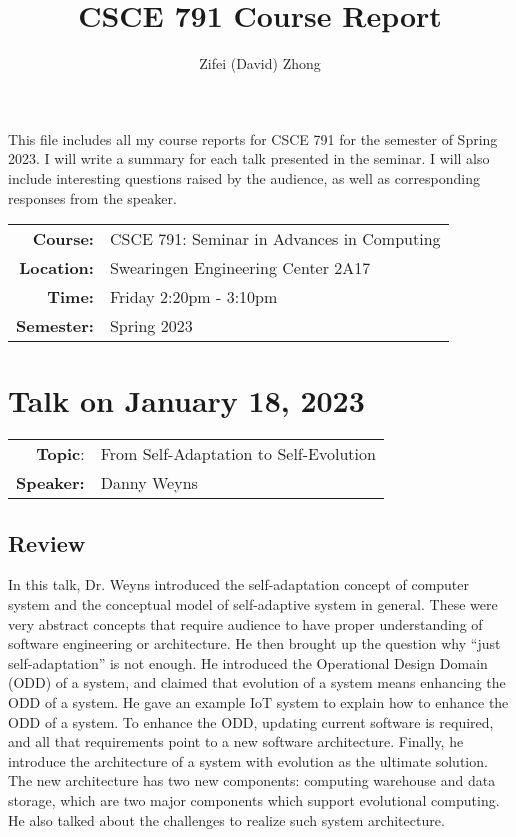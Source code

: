 \documentclass[11pt, oneside]{article}   	%
\title{CSCE 791 Course Report}
\author{Zifei (David) Zhong}
\begin{document}
\maketitle

This file includes all my course reports for CSCE 791 for the semester
of Spring 2023. I will write a summary for each talk presented in the
seminar. I will also include interesting questions raised by the
audience, as well as corresponding responses from the speaker.\\

\begin{center}
\begin{tabularx}{0.65\textwidth}{r X}
\textbf{Course:} & CSCE 791: Seminar in Advances in Computing\\
\textbf{Location:} & Swearingen Engineering Center 2A17\\
\textbf{Time:} & Friday 2:20pm - 3:10pm\\
\textbf{Semester:} & Spring 2023
\end{tabularx}
\end{center}

\newpage
\section{Talk on January 18, 2023}
\begin{tabularx} {\textwidth}{r X}
\textbf{Topic}: & From Self-Adaptation to Self-Evolution \\
\textbf{Speaker:} & Danny Weyns \\
\end{tabularx}

\subsection{Review}
In this talk, Dr. Weyns introduced the self-adaptation concept of computer system and the conceptual model of self-adaptive system in general. These were very abstract concepts that require audience to have proper understanding of software engineering or architecture. He then brought up the question why ``just self-adaptation'' is not enough. He introduced the Operational Design Domain (ODD) of a system, and claimed that evolution of a system means enhancing the ODD of a system. He gave an example IoT system to explain how to enhance the ODD of a system. To enhance the ODD, updating current software is required, and all that requirements point to a new software architecture. Finally, he introduce the architecture of a system with evolution as the ultimate solution. The new architecture has two new components: computing warehouse and data storage, which are two major components which support evolutional computing. He also talked about the challenges to realize such system architecture.
\end{document}
